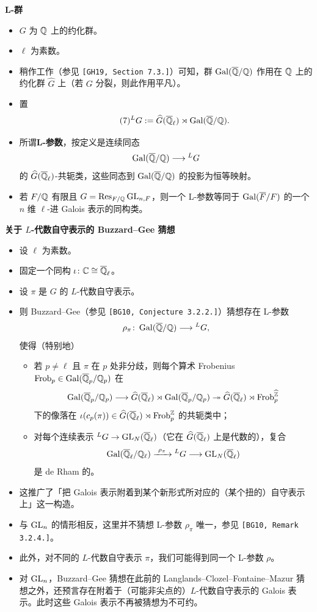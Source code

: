 \medskip
\noindent\textbf{L-群}
\begin{itemize}
\item $G$ 为 $\mathbb{Q}$ 上的约化群。
\item $\ell$ 为素数。
\item 稍作工作（参见 \texttt{[GH19, Section 7.3.]}）可知，群 $\operatorname{Gal}(\overline{\mathbb{Q}}/\mathbb{Q})$ 作用在 $\mathbb{Q}$ 上的约化群 $\widehat G$ 上（若 $G$ 分裂，则此作用平凡）。
\item 置
\begin{equation}\tag{7}\label{eq:12.7}
{}^LG:=\widehat G(\overline{\mathbb{Q}}_\ell)\rtimes\operatorname{Gal}(\overline{\mathbb{Q}}/\mathbb{Q}).
\end{equation}
\item 所谓\textbf{L-参数}，按定义是连续同态
\[
\operatorname{Gal}(\overline{\mathbb{Q}}/\mathbb{Q})\longrightarrow{}^LG
\]
的 $\widehat G(\overline{\mathbb{Q}}_\ell)$-共轭类，这些同态到 $\operatorname{Gal}(\overline{\mathbb{Q}}/\mathbb{Q})$ 的投影为恒等映射。
\item 若 $F/\mathbb{Q}$ 有限且 $G=\operatorname{Res}_{F/\mathbb{Q}}\operatorname{GL}_{n,F}$，则一个 L-参数等同于 $\operatorname{Gal}(\overline F/F)$ 的一个 $n$ 维 $\ell$-进 Galois 表示的同构类。
\end{itemize}

\medskip
\noindent\textbf{关于 $L$-代数自守表示的 Buzzard–Gee 猜想}
\begin{itemize}
\item 设 $\ell$ 为素数。
\item 固定一个同构 $\iota\colon\mathbb{C}\cong\overline{\mathbb{Q}}_\ell$。
\item 设 $\pi$ 是 $G$ 的 $L$-代数自守表示。
\item 则 Buzzard–Gee（参见 \texttt{[BG10, Conjecture 3.2.2.]}）猜想存在 L-参数
\[
\rho_\pi\colon\operatorname{Gal}(\overline{\mathbb{Q}}/\mathbb{Q})\longrightarrow{}^LG,
\]
使得（特别地）
\begin{itemize}
\item 若 $p\ne\ell$ 且 $\pi$ 在 $p$ 处非分歧，则每个算术 Frobenius $\operatorname{Frob}_p\in\operatorname{Gal}(\overline{\mathbb{Q}}_p/\mathbb{Q}_p)$ 在
\[
\operatorname{Gal}(\overline{\mathbb{Q}}_p/\mathbb{Q}_p)\longrightarrow\widehat G(\overline{\mathbb{Q}}_\ell)\rtimes\operatorname{Gal}(\overline{\mathbb{Q}}_p/\mathbb{Q}_p)\twoheadrightarrow\widehat G(\overline{\mathbb{Q}}_\ell)\rtimes\operatorname{Frob}_p^{\widehat{\mathbb{Z}}}
\]
下的像落在 $\iota(c_p(\pi))\in\widehat G(\overline{\mathbb{Q}}_\ell)\rtimes\operatorname{Frob}_p^{\mathbb{Z}}$ 的共轭类中；
\item 对每个连续表示 ${}^LG\to\operatorname{GL}_N(\overline{\mathbb{Q}}_\ell)$（它在 $\widehat G(\overline{\mathbb{Q}}_\ell)$ 上是代数的），复合
\[
\Gal(\overline{\Q}_\ell/\Q_\ell)\xrightarrow{\ \rho_\pi\ }{}^LG\longrightarrow\GL_N(\Ql)
\]
是 de Rham 的。
\end{itemize}
\item 这推广了「把 Galois 表示附着到某个新形式所对应的（某个扭的）自守表示上」这一构造。
\item 与 $\operatorname{GL}_n$ 的情形相反，这里并不猜想 L-参数 $\rho_\pi$ 唯一，参见 \texttt{[BG10, Remark 3.2.4.]}。
\item 此外，对不同的 $L$-代数自守表示 $\pi$，我们可能得到同一个 L-参数 $\rho$。
\item 对 $\operatorname{GL}_n$，Buzzard–Gee 猜想在此前的 Langlands–Clozel–Fontaine–Mazur 猜想之外，还预言存在附着于（可能非尖点的）$L$-代数自守表示的 Galois 表示。此时这些 Galois 表示不再被猜想为不可约。
\end{itemize}

